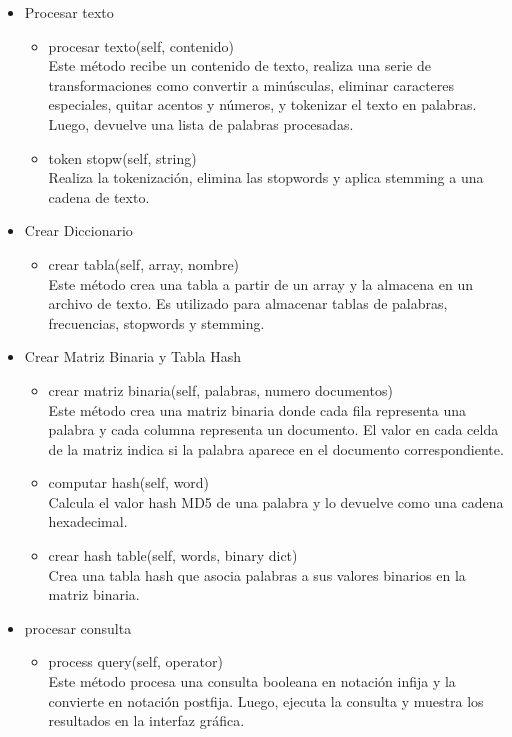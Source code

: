 \begin{itemize}
\begin{itemize}
  \end{itemize}
  \item Procesar texto
  \begin{itemize}
    \item procesar texto(self, contenido) \\ Este método recibe un contenido de texto, realiza una serie de transformaciones como convertir a minúsculas, eliminar caracteres especiales, quitar acentos y números, y tokenizar el texto en palabras. Luego, devuelve una lista de palabras procesadas.
    \item token stopw(self, string) \\ Realiza la tokenización, elimina las stopwords y aplica stemming a una cadena de texto.
  \end{itemize}
  \item Crear Diccionario
  \begin{itemize}
    \item crear tabla(self, array, nombre) \\ Este método crea una tabla a partir de un array y la almacena en un archivo de texto. Es utilizado para almacenar tablas de palabras, frecuencias, stopwords y stemming.
  \end{itemize}
  \item Crear Matriz Binaria y Tabla Hash
  \begin{itemize}
    \item crear matriz binaria(self, palabras, numero documentos) \\ Este método crea una matriz binaria donde cada fila representa una palabra y cada columna representa un documento. El valor en cada celda de la matriz indica si la palabra aparece en el documento correspondiente.
    \item computar hash(self, word) \\ Calcula el valor hash MD5 de una palabra y lo devuelve como una cadena hexadecimal.
    \item crear hash table(self, words, binary dict) \\ Crea una tabla hash que asocia palabras a sus valores binarios en la matriz binaria.
  \end{itemize}
  \item procesar consulta
  \begin{itemize}
    \item process query(self, operator) \\ Este método procesa una consulta booleana en notación infija y la convierte en notación postfija. Luego, ejecuta la consulta y muestra los resultados en la interfaz gráfica.

\end{itemize}
\end{itemize}
